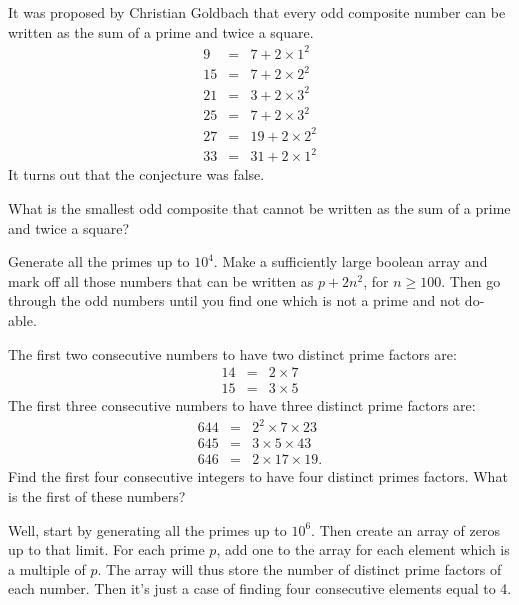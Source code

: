 



It was proposed by Christian Goldbach that every odd composite number can be written as the sum of a prime and twice a square.
\begin{eqnarray*}
9 &= &7 + 2\times1^2\\
15 &= &7 + 2\times2^2\\
21 &= &3 + 2\times3^2\\
25 &= &7 + 2\times3^2\\
27 &= &19 + 2\times2^2\\
33 &= &31 + 2\times1^2
\end{eqnarray*}
It turns out that the conjecture was false.

What is the smallest odd composite that cannot be written as the sum of a prime and twice a square?

Generate all the primes up to $10^4$.  Make a sufficiently large boolean array and mark off
all those numbers that can be written as $p + 2n^2$, for $n \geq 100$.  Then go through the odd
numbers until you find one which is not a prime and not do-able.




The first two consecutive numbers to have two distinct prime factors are:
\begin{eqnarray*}
14 &= &2 \times 7 \\
15 &= &3 \times 5
\end{eqnarray*}
The first three consecutive numbers to have three distinct prime factors are:
\begin{eqnarray*}
644 &= &2^2 \times 7 \times 23  \\
645 &= &3 \times 5 \times 43    \\
646 &= &2 \times 17 \times 19.
\end{eqnarray*}
Find the first four consecutive integers to have four distinct primes factors. What is the first of these numbers?

Well, start by generating all the primes up to $10^6$.  Then create an array of zeros up to that limit.
For each prime $p$, add one to the array for each element which is a multiple of $p$.  The array will
thus store the number of distinct prime factors of each number.  Then it's just a case of finding
four consecutive elements equal to 4.

